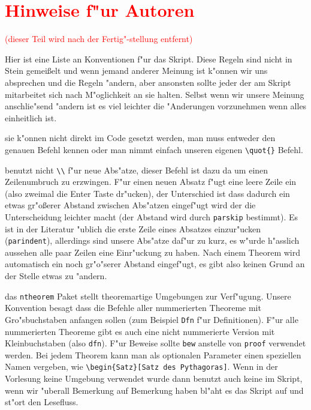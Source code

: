 \documentclass[paper=A4, twoside, chapterprefix=true, bibliography=totoc, headsepline]{scrbook}
\begin{document}
\section*{\textcolor{red}{Hinweise f"ur Autoren}}
\textcolor{red}{(dieser Teil wird nach der Fertig"-stellung entfernt)}

Hier ist eine Liste an Konventionen f"ur das Skript.
Diese Regeln sind nicht in Stein gemei\ss elt und wenn jemand anderer Meinung ist k"onnen wir uns absprechen und die Regeln "andern, aber ansonsten sollte jeder der am Skript mitarbeitet sich nach M"oglichkeit an sie halten.
Selbst wenn wir unsere Meinung anschlie"send "andern ist es viel leichter die "Anderungen vorzunehmen wenn alles einheitlich ist.

\begin{description}[font=\normalfont\itshape]
\item[Anf"uhrungszeichen:]
	sie k"onnen nicht direkt im Code gesetzt werden, man muss entweder den genauen Befehl kennen oder man nimmt einfach unseren eigenen \verb|\quot{}| Befehl.
\item[Abs"atze:]
	benutzt nicht \verb|\\| f"ur neue Abs"atze, dieser Befehl ist dazu da um einen Zeilenumbruch zu erzwingen.
	F"ur einen neuen Absatz f"ugt eine leere Zeile ein (also zweimal die Enter Taste dr"ucken), der Unterschied ist dass dadurch ein etwas gr"o\ss erer Abstand zwischen Abs"atzen eingef"ugt wird der die Unterscheidung leichter macht (der Abstand wird durch \verb|parskip| bestimmt).
	Es ist in der Literatur "ublich die erste Zeile eines Absatzes einzur"ucken (\verb|parindent|), allerdings sind unsere Abs"atze daf"ur zu kurz, es w"urde h"asslich aussehen alle paar Zeilen eine Einr"uckung zu haben.
	Nach einem Theorem wird automatisch ein noch gr"o"serer Abstand eingef"ugt, es gibt also keinen Grund an der Stelle etwas zu "andern.
\item[Theoreme:]
	das \verb|ntheorem| Paket stellt theoremartige Umgebungen zur Verf"ugung.
	Unsere Konvention besagt dass die Befehle aller nummerierten Theoreme mit Gro"sbuchstaben anfangen sollen (zum Beispiel \verb|Dfn| f"ur Definitionen).
	F"ur alle nummerierten Theoreme gibt es auch eine nicht nummerierte Version mit Kleinbuchstaben (also \verb|dfn|).
	F"ur Beweise sollte \verb|bew| anstelle von \verb|proof| verwendet werden.
	Bei jedem Theorem kann man als optionalen Parameter einen speziellen Namen vergeben, wie \verb|\begin{Satz}[Satz des Pythagoras]|.
	Wenn in der Vorlesung keine Umgebung verwendet wurde dann benutzt auch keine im Skript, wenn wir "uberall Bemerkung auf Bemerkung haben bl"aht es das Skript auf und st"ort den Lesefluss.

\end{description}
\end{document}
